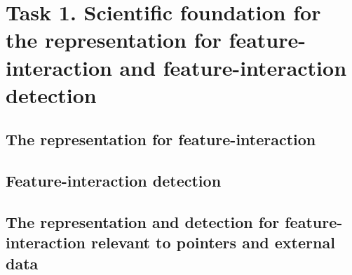 \section{Task 1. Scientific foundation for the representation for feature-interaction and feature-interaction detection}
\label{task1-section}

\subsection{The representation for feature-interaction}

\subsection{Feature-interaction detection}

\subsection{The representation and detection for feature-interaction relevant to pointers and external data}